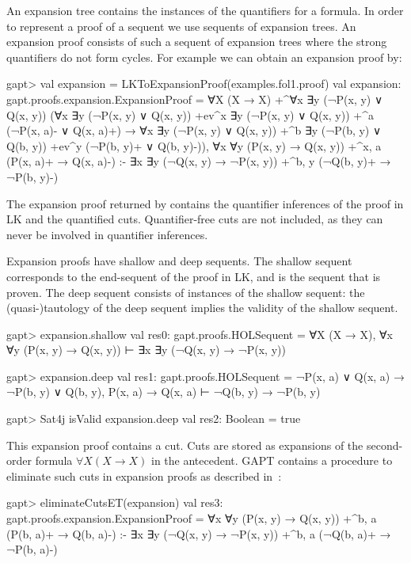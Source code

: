 \documentclass[a4paper,11pt]{book}
\newcommand{\impl}{\to} %
\newcommand{\cli}[1]{{\ttfamily {#1}}}
\begin{document}
An expansion tree contains the instances of the quantifiers for a formula.  In order
to represent a proof of a sequent we use sequents of expansion trees.  An
expansion proof consists of such a sequent of expansion trees where the
strong quantifiers do not form cycles.
For example we can obtain an expansion proof by:
\begin{clilisting}
gapt> val expansion = LKToExpansionProof(examples.fol1.proof)
val expansion: gapt.proofs.expansion.ExpansionProof =
∀X (X → X)
  +^{∀x ∃y (¬P(x, y) ∨ Q(x, y))}
    (∀x ∃y (¬P(x, y) ∨ Q(x, y)) +ev^{x}
        ∃y (¬P(x, y) ∨ Q(x, y))
        +^{a} (¬P(x, a)- ∨ Q(x, a)+) →
      ∀x ∃y (¬P(x, y) ∨ Q(x, y))
        +^{b} ∃y (¬P(b, y) ∨ Q(b, y)) +ev^{y} (¬P(b, y)+ ∨ Q(b, y)-)),
∀x ∀y (P(x, y) → Q(x, y)) +^{x, a} (P(x, a)+ → Q(x, a)-)
:-
∃x ∃y (¬Q(x, y) → ¬P(x, y)) +^{b, y} (¬Q(b, y)+ → ¬P(b, y)-)

\end{clilisting}

The expansion proof returned by \cli{LKToExpansionProof} contains the
quantifier inferences of the proof in LK and the quantified cuts.
Quantifier-free cuts are not included, as they can never be involved in
quantifier inferences.

Expansion proofs have shallow and deep sequents.  The shallow sequent
corresponds to the end-sequent of the proof in LK, and is the sequent that is
proven.  The deep sequent consists of instances of the shallow sequent: the
(quasi-)tautology of the deep sequent implies the validity of the shallow
sequent.
\begin{clilisting}
gapt> expansion.shallow
val res0: gapt.proofs.HOLSequent = ∀X (X → X), ∀x ∀y (P(x, y) → Q(x, y)) ⊢ ∃x ∃y (¬Q(x, y) → ¬P(x, y))

gapt> expansion.deep
val res1: gapt.proofs.HOLSequent = ¬P(x, a) ∨ Q(x, a) → ¬P(b, y) ∨ Q(b, y), P(x, a) → Q(x, a) ⊢ ¬Q(b, y) → ¬P(b, y)

gapt> Sat4j isValid expansion.deep
val res2: Boolean = true

\end{clilisting}

This expansion proof contains a cut.  Cuts are stored as expansions of the
second-order formula $\forall X (X \impl X)$ in the antecedent.  GAPT contains
a procedure to eliminate such cuts in expansion proofs as described
in~\cite{Hetzl2013Expansion}:
\begin{clilisting}
gapt> eliminateCutsET(expansion)
val res3: gapt.proofs.expansion.ExpansionProof =
∀x ∀y (P(x, y) → Q(x, y)) +^{b, a} (P(b, a)+ → Q(b, a)-)
:-
∃x ∃y (¬Q(x, y) → ¬P(x, y)) +^{b, a} (¬Q(b, a)+ → ¬P(b, a)-)

\end{clilisting}
\end{document}
